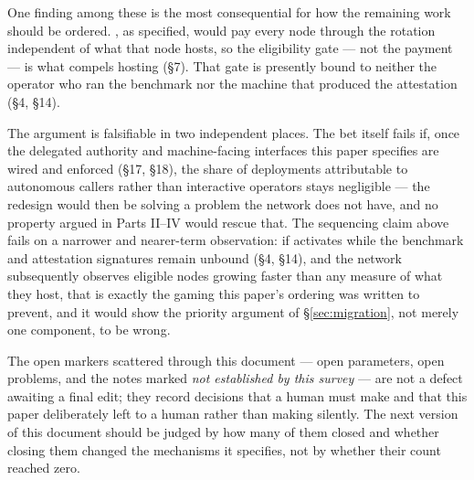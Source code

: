One finding among these is the most consequential for how the remaining work should be ordered.
\PNR, as specified, would pay every node through the \PoN rotation independent of what that node
hosts, so the eligibility gate --- not the payment --- is what compels hosting (§7). That gate is
presently bound to neither the operator who ran the benchmark nor the machine that produced the
attestation (§4, §14). 

The argument is falsifiable in two independent places. The bet itself fails if, once the delegated
authority and machine-facing interfaces this paper specifies are wired and enforced (§17, §18), the
share of deployments attributable to autonomous callers rather than interactive operators stays
negligible --- the redesign would then be solving a problem the network does not have, and no property
argued in Parts II--IV would rescue that. The sequencing claim above fails on a narrower and
nearer-term observation: if \PNR activates while the benchmark and attestation signatures remain
unbound (§4, §14), and the network subsequently observes eligible nodes growing faster than any measure
of what they host, that is exactly the gaming this paper's ordering was written to prevent, and it
would show the priority argument of \S\ref{sec:migration}, not merely one component, to be wrong.

The open markers scattered through this document --- open parameters, open problems, and the notes
marked \emph{not established by this survey} --- are not a defect awaiting a final edit; they record decisions that a human must make and
that this paper deliberately left to a human rather than making silently. The next version of this
document should be judged by how many of them closed and whether closing them changed the mechanisms
it specifies, not by whether their count reached zero.

\FloatBarrier
